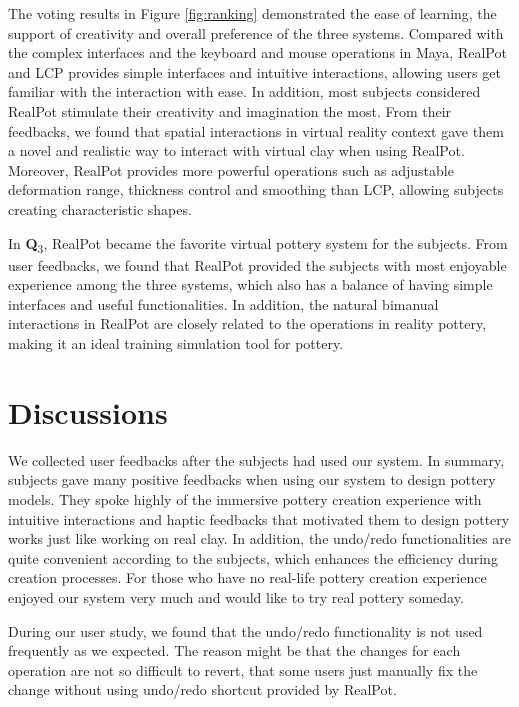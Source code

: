 \documentclass{svjour3}                     %
\begin{document}
The voting results in Figure \ref{fig:ranking} demonstrated the ease of learning, the support of creativity and overall preference of the three systems.
Compared with the complex interfaces and the keyboard and mouse operations in Maya, RealPot and LCP provides simple interfaces and intuitive interactions, allowing users get familiar with the interaction with ease.
In addition, most subjects considered RealPot stimulate their creativity and imagination the most. From their feedbacks, we found that spatial interactions in virtual reality context gave them a novel and realistic way to interact with virtual clay when using RealPot. Moreover, RealPot provides more powerful operations such as adjustable deformation range, thickness control and smoothing than LCP, allowing subjects creating characteristic shapes.

In \textbf{Q}\textsubscript{3}, RealPot became the favorite virtual pottery system for the subjects. From user feedbacks, we found that RealPot provided the subjects with most enjoyable experience among the three systems, which also has a balance of having simple interfaces and useful functionalities. In addition, the natural bimanual interactions in RealPot are closely related to the operations in reality pottery, making it an ideal training simulation tool for pottery.

\section{Discussions}
\label{sec:7}
We collected user feedbacks after the subjects had used our system. In summary, subjects gave many positive feedbacks when using our system to design pottery models. They spoke highly of the immersive pottery creation experience with intuitive interactions and haptic feedbacks that motivated them to design pottery works just like working on real clay. In addition, the undo/redo functionalities are quite convenient according to the subjects, which enhances the efficiency during creation processes. For those who have no real-life pottery creation experience enjoyed our system very much and would like to try real pottery someday. 

During our user study, we found that the undo/redo functionality is not used frequently as we expected.
The reason might be that the changes for each operation are not so difficult to revert, that some users just manually fix the change without using undo/redo shortcut provided by RealPot.
\end{document}
